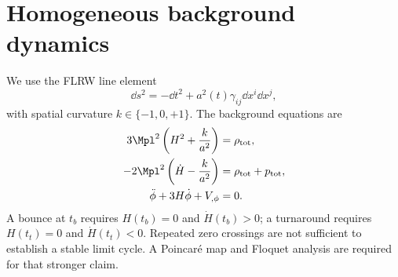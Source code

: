\section{Homogeneous background dynamics}
\label{sec:background}

We use the FLRW line element
\begin{equation}
\dd s^2=-\dd t^2+a^2(t)\gamma_{ij}\dd x^i\dd x^j,
\end{equation}
with spatial curvature $k\in\{-1,0,+1\}$. The background equations are
\begin{align}
3\Mpl^2\left(H^2+\frac{k}{a^2}\right)&=\rho_{\mathrm{tot}},\\
-2\Mpl^2\left(\dot H-\frac{k}{a^2}\right)&=\rho_{\mathrm{tot}}+p_{\mathrm{tot}},\\
\ddot\phi+3H\dot\phi+V_{,\phi}&=0.
\end{align}
A bounce at $t_b$ requires $H(t_b)=0$ and $\dot H(t_b)>0$; a turnaround requires $H(t_t)=0$ and $\dot H(t_t)<0$. Repeated zero crossings are not sufficient to establish a stable limit cycle. A Poincar\'{e} map and Floquet analysis are required for that stronger claim.

